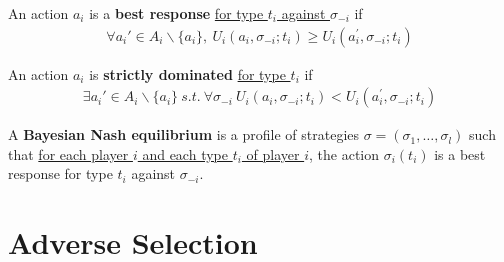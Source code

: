\documentclass{article}
\begin{document}
   	\begin{definition}
   		An action $a_i$ is a \textbf{best response} \ul{for type $t_i$ against $\sigma_{-i}$} if
   		\begin{align}
   			\forall a_i' \in A_i \backslash \{a_i\},\ U_{i}\left(a_{i}, \sigma_{-i} ; t_{i}\right) \geq U_{i}\left(a_{i}^{\prime}, \sigma_{-i} ; t_{i}\right)
   		\end{align}
   	\end{definition}
   	
   	\begin{definition}
   		An action $a_i$ is \textbf{strictly dominated} \ul{for type $t_i$} if
   		\begin{align}
   			\exists a_i' \in A_i \backslash \{a_i\}\ s.t.\ \forall \sigma_{-i}\ U_{i}\left(a_{i}, \sigma_{-i} ; t_{i}\right)<U_{i}\left(a_{i}^{\prime}, \sigma_{-i} ; t_{i}\right)
   		\end{align}
   	\end{definition}
   	
   	\begin{definition}
   		A \textbf{Bayesian Nash equilibrium} is a profile of strategies $\sigma=\left(\sigma_{1}, \ldots, \sigma_{l}\right)$ such that \ul{for each player $i$ and each type $t_i$ of player $i$}, the action $\sigma_{i}\left(t_{i}\right)$ is a best response for type $t_{i}$ against $\sigma_{-i}$.
   	\end{definition}
   	
   	\section{Adverse Selection}
\end{document}
